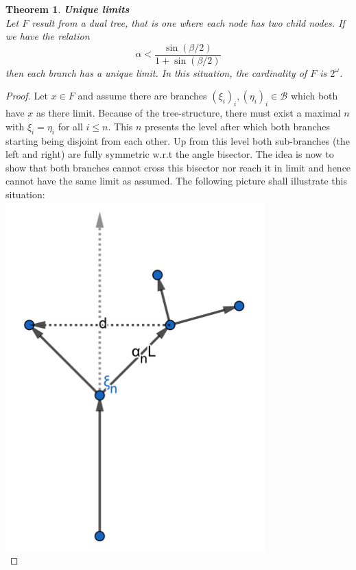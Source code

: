 \documentclass[17pt]{extarticle}
\newtheorem{theorem}{Theorem}
\begin{document}
\begin{theorem} \label{unique_limits} 
	\textbf{Unique limits}\\
	Let $F$ result from a dual tree, that is one where each node has two child nodes.
	If we have the relation
	\begin{equation} \label{unique_branch_relation}
	\alpha<\frac{\sin(\beta/2)}{1+\sin(\beta/2)}
	\end{equation}
	then each branch has a unique limit.
	In this situation, the cardinality of $F$ is $2^{\omega}$.
\end{theorem}
\begin{proof}
	Let $x\in F$ and assume there are branches $(\xi_i)_i, (\eta_i)_i\in\mathcal{B}$ which both have $x$ as there limit. Because of the tree-structure, there must exist a maximal $n$ with $\xi_i=\eta_i$ for all $i\leq n$. This $n$ presents the level after which both branches starting being disjoint from each other. Up from this level both sub-branches (the left and right) are fully symmetric w.r.t the angle bisector. The idea is now to show that both branches cannot cross this bisector nor reach it in limit and hence cannot have the same limit as assumed. The following picture shall illustrate this situation:\\
	\includegraphics[width=10cm]{unique_branch}
	\\

\end{proof}
\end{document}
